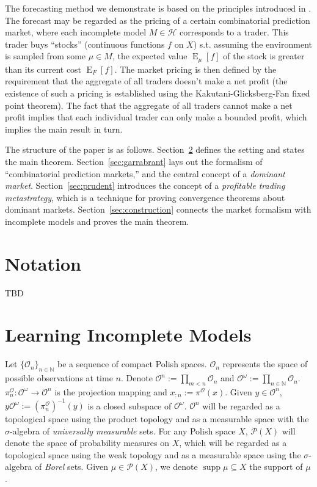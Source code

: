 \documentclass[11pt]{article}
\theoremstyle{definition}
\theoremstyle{plain}
\newcommand{\Nats}{\mathbb{N}}
\newcommand{\Sq}[2]{\{#1\}_{#2 \in \Nats}}
\newcommand{\Sqn}[1]{\Sq{#1}{n}}
\DeclareMathOperator{\E}{E}
\newcommand{\PM}{\mathcal{P}}
\DeclareMathOperator{\Sp}{supp}
\newcommand{\Ob}{\mathcal{O}}
\newcommand{\OO}{\Ob^\omega}
\newcommand{\PO}{\pi^\Ob}
\newcommand{\MC}{\mathcal{H}}
\begin{document}
The forecasting method we demonstrate is based on the principles introduced in \cite{Garrabrant_2016}. The forecast may be regarded as the pricing of a certain combinatorial prediction market, where each incomplete model $M \in \MC$ corresponds to a trader. This trader buys \enquote{stocks} (continuous functions $f$ on $X$) s.t. assuming the environment is sampled from some $\mu \in M$, the expected value $\E_\mu[f]$ of the stock is greater than its current cost $\E_{F}[f]$. The market pricing is then defined by the requirement that the aggregate of all traders doesn't make a net profit (the existence of such a pricing is established using the Kakutani-Glicksberg-Fan fixed point theorem). The fact that the aggregate of all traders cannot make a net profit implies that each individual trader can only make a bounded profit, which implies the main result in turn.

The structure of the paper is as follows. Section~\ref{sec:learning} defines the setting and states the main theorem. Section~\ref{sec:garrabrant} lays out the formalism of \enquote{combinatorial prediction markets,} and the central concept of a \emph{dominant market}. Section~\ref{sec:prudent} introduces the concept of a \emph{profitable trading metastrategy}, which is a technique for proving convergence theorems about dominant markets. Section~\ref{sec:construction} connects the market formalism with incomplete models and proves the main theorem.

\section{Notation}
\label{sec:notation}

TBD

\section{Learning Incomplete Models}
\label{sec:learning}

Let $\Sqn{\Ob_n}$ be a sequence of compact Polish spaces. $\Ob_n$ represents the space of possible observations at time $n$. Denote $\Ob^n := \prod_{m < n} \Ob_n$  and $\Ob^\omega:=\prod_{n \in \Nats} \Ob_n$. $\PO_n: \Ob^\omega \rightarrow \Ob^n$ is the projection mapping and $x_{:n}:=\PO(x)$. Given $y \in \Ob^n$, $y\OO := (\PO_n)^{-1}(y)$ is a closed subspace of $\OO$. $\Ob^n$ will be regarded as a topological space using the product topology and as a measurable space with the $\sigma$-algebra of \emph{universally measurable} sets. For any Polish space $X$, $\PM(X)$ will denote the space of probability measures on $X$, which will be regarded as a topological space using the weak topology and as a measurable space using the $\sigma$-algebra of \emph{Borel} sets. Given $\mu \in \PM(X)$, we denote $\Sp \mu \subseteq X$ the support of $\mu$.
\end{document}
